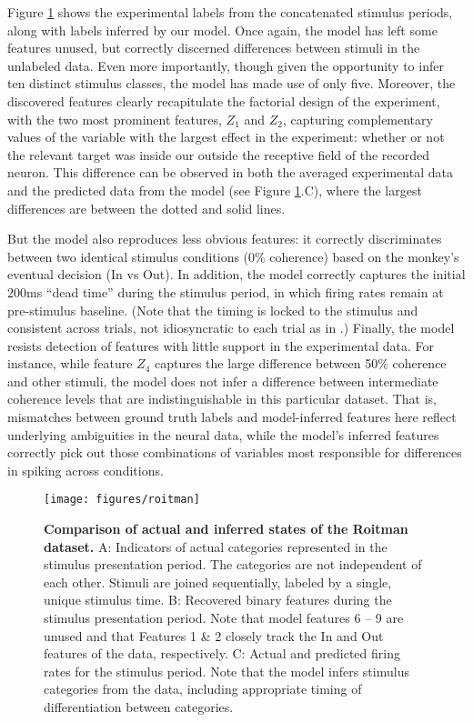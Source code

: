 \documentclass{nature}
\begin{document}
Figure \ref{roitman} shows the experimental labels from the concatenated stimulus periods, along with labels inferred by our model. Once again, the model has left some features unused, but correctly discerned differences between stimuli in the unlabeled data. Even more importantly, though given the opportunity to infer ten distinct stimulus classes, the model has made use of only five. Moreover, the discovered features clearly recapitulate the factorial design of the experiment, with the two most prominent features, $Z_1$ and $Z_2$, capturing complementary values of the variable with the largest effect in the experiment: whether or not the relevant target was inside our outside the receptive field of the recorded neuron. This difference can be observed in both the averaged experimental data and the predicted data from the model (see Figure \ref{roitman}.C), where the largest differences are between the dotted and solid lines.

But the model also reproduces less obvious features: it correctly discriminates between two identical stimulus conditions (0\% coherence) based on the monkey's eventual decision (In vs Out). In addition, the model correctly captures the initial 200ms ``dead time'' during the stimulus period, in which firing rates remain at pre-stimulus baseline. (Note that the timing is locked to the stimulus and consistent across trials, not idiosyncratic to each trial as in \cite{Latimer2015-pb}.) Finally, the model resists detection of features with little support in the experimental data. For instance, while feature $Z_4$ captures the large difference between 50\% coherence and other stimuli, the model does not infer a difference between intermediate coherence levels that are indistinguishable in this particular dataset. That is, mismatches between ground truth labels and model-inferred features here reflect underlying ambiguities in the neural data, while the model's inferred features correctly pick out those combinations of variables most responsible for differences in spiking across conditions.

\begin{figure}
    \texttt{[image: figures/roitman]}
	\caption{\textbf{Comparison of actual and inferred states of the Roitman dataset.}
	A: Indicators of actual categories represented in the stimulus presentation period. The categories are not independent of each other. Stimuli are joined sequentially, labeled by a single, unique stimulus time. B: Recovered binary features during the stimulus presentation period. Note that model features 6 -- 9 are unused and that Features 1 \& 2 closely track the In and Out features of the data, respectively. C: Actual and predicted firing rates for the stimulus period. Note that the model infers stimulus categories from the data, including appropriate timing of differentiation between categories.}
	\label{roitman}
\end{figure}
\end{document}
